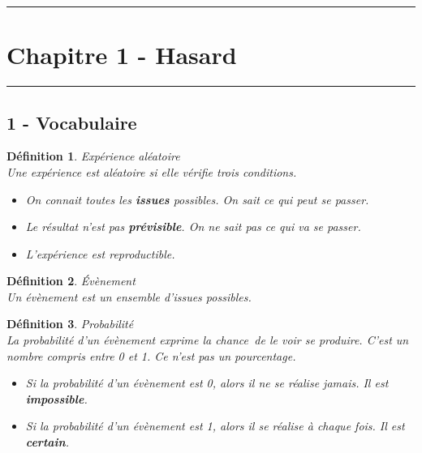 \documentclass[12pt]{article}
\newcommand{\horrule}[1]{\rule{\linewidth}{#1}} %
\begin{document}

\newtheorem{Definition}{Définition}
\newtheorem{Theorem}{Théorème}
\newtheorem{Proposition}{Propriété}

\renewcommand{\labelitemi}{$\bullet$}
\renewcommand{\labelitemii}{$\circ$}

\setlength{\columnseprule}{1pt}

\horrule{2px}
\section*{Chapitre 1 - Hasard}
\horrule{2px}

\subsection*{1 - Vocabulaire}

\begin{Definition}{Expérience aléatoire}\\
Une expérience est aléatoire si elle vérifie trois conditions.
\begin{itemize}
\item On connait toutes les \textbf{issues} possibles. \textit{On sait ce qui peut se passer.}
\item Le résultat n'est pas \textbf{prévisible}. \textit{On ne sait pas ce qui va se passer.}
\item L'expérience est reproductible.
\end{itemize}
\end{Definition}

\begin{Definition}{Évènement}\\
Un évènement est un ensemble d'issues possibles.
\end{Definition}

\begin{Definition}{Probabilité}\\
La probabilité d'un évènement exprime la \og chance\fg\, de le voir se produire. C'est un nombre compris entre 0 et 1.  \textit{Ce n'est pas un pourcentage}.

\begin{itemize}
\item Si la probabilité d'un évènement est 0, alors il ne se réalise jamais. Il est \textbf{impossible}.
\item Si la probabilité d'un évènement est 1, alors il se réalise à chaque fois. Il est \textbf{certain}.
\end{itemize}
\end{Definition}
\end{document}
